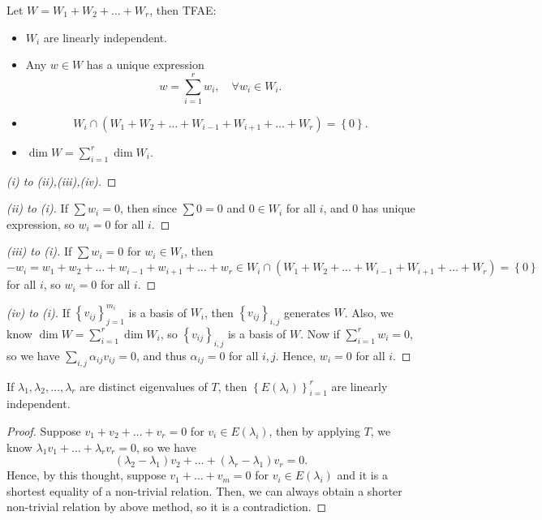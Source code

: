\begin{proposition} \label{propl: linearly independent of subspace TFAE}
    Let \(W = W_1 + W_2 + \dots + W_r\), then TFAE:
    \begin{itemize}
        \item [(i)] \(W_i\) are linearly independent. 
        \item [(ii)] Any \(w \in W\) has a unique expression 
        \[
            w = \sum_{i=1}^r w_i, \quad \forall w_i \in W_i. 
        \]
        \item [(iii)] 
        \[
            W_i \cap \left( W_1 + W_2 + \dots + W_{i-1} + W_{i+1} + \dots + W_r \right) = \left\{ 0 \right\}.  
        \]
        \item [(iv)] \(\dim W = \sum_{i=1}^r \dim W_i \). 
    \end{itemize} 
\end{proposition}
\begin{proof}[(i) to (ii),(iii),(iv)]
\end{proof}
\begin{proof}[(ii) to (i)]
    If \(\sum w_i = 0 \), then since \(\sum 0 = 0 \) and \(0 \in W_i\) for all \(i\), and \(0\) has unique expression, so \(w_i = 0\) for all \(i\).       
\end{proof}
\begin{proof}[(iii) to (i)]
    If \(\sum w_i = 0 \) for \(w_i \in W_i\), then
    \[
        -w_i = w_1 + w_2 + \dots + w_{i-1} + w_{i+1} + \dots + w_r \in W_i \cap \left( W_1 + W_2 + \dots + W_{i-1} + W_{i+1} + \dots + W_r \right) = \left\{ 0 \right\} 
    \] for all \(i\), so \(w_i = 0\) for all \(i\).   
\end{proof}
\begin{proof}[(iv) to (i)]
    If \(\left\{ v_{ij} \right\}_{j=1}^{m_i} \) is a basis of \(W_i\), then \(\left\{ v_{ij} \right\}_{i,j} \) generates \(W\). Also, we know \(\dim W = \sum_{i=1}^r \dim W_i \), so \(\left\{ v_{ij} \right\}_{i,j} \) is a basis of \(W\). Now if \(\sum_{i=1}^r w_i = 0 \), so we have \(\sum_{i,j} \alpha _{ij} v_{ij} = 0 \), and thus \(\alpha _{ij} = 0\) for all \(i, j\). Hence, \(w_i = 0\) for all \(i\).             
\end{proof}

\begin{proposition}
    If \(\lambda _1, \lambda _2, \dots , \lambda _r\) are distinct eigenvalues of \(T\), then \(\left\{ E(\lambda _i) \right\}_{i=1}^r \) are linearly independent.   
\end{proposition}
\begin{proof}
    Suppose \(v_1 + v_2 + \dots + v_r = 0\) for \(v_i \in E(\lambda _i)\), then by applying \(T\), we know \(\lambda _1 v_1 + \dots + \lambda _r v_r = 0\), so we have 
    \[
        (\lambda _2 - \lambda _1) v_2 + \dots + (\lambda _r - \lambda _1) v_r = 0.
    \] Hence, by this thought, suppose \(v_1 + \dots + v_m = 0\) for \(v_i \in E(\lambda _i)\) and it is a shortest equality of a non-trivial relation. Then, we can always obtain a shorter non-trivial relation by above method, so it is a contradiction.  
\end{proof}

